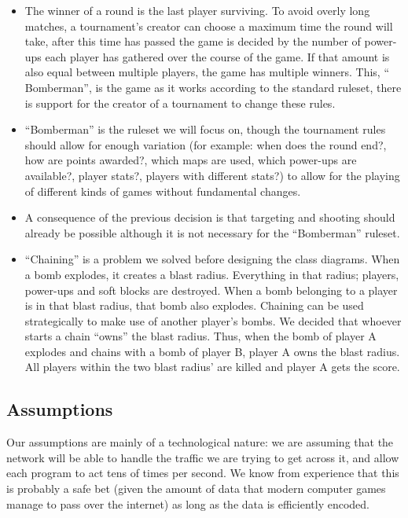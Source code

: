 \documentclass[a4paper,twoside,11pt]{article}
\begin{document}
\begin{itemize}
    \item The winner of a round is the last player surviving. To avoid overly long matches, a tournament's creator can choose a maximum time the round will take, after this time has passed the game is decided by the number of power-ups each player has gathered over the course of the game. If that amount is also equal between multiple players, the game has multiple winners. This, `` Bomberman'', is the game as it works according to the standard ruleset, there is support for the creator of a tournament to change these rules.

    \item ``Bomberman'' is the ruleset we will focus on, though the tournament rules should allow for enough variation (for example: when does the round end?, how are points awarded?, which maps are used, which power-ups are available?, player stats?, players with different stats?) to allow for the playing of different kinds of games without fundamental changes.

    \item A consequence of the previous decision is that targeting and shooting should already be possible although it is not necessary for the ``Bomberman'' ruleset.

    \item ``Chaining'' is a problem we solved before designing the class diagrams. When a bomb explodes, it creates a blast radius. Everything in that radius; players, power-ups and soft blocks are destroyed. When a bomb belonging to a player is in that blast radius, that bomb also explodes. Chaining can be used strategically to make use of another player's bombs. We decided that whoever starts a chain ``owns'' the blast radius. Thus, when the bomb of player A explodes and chains with a bomb of player B, player A owns the blast radius. All players within the two blast radius' are killed and player A gets the score.

\end{itemize}

\subsection{Assumptions}

Our assumptions are mainly of a technological nature: we are assuming that the network will be able to handle the traffic we are trying to get across it, and allow each program to act tens of times per second. We know from experience that this is probably a safe bet (given the amount of data that modern computer games manage to pass over the internet) as long as the data is efficiently encoded.
\end{document}
